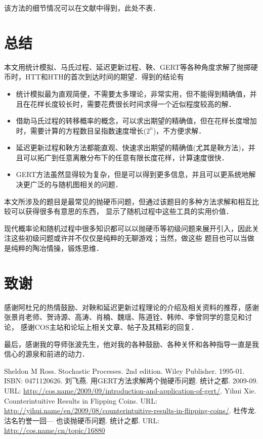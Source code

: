 \documentclass{article}
\begin{document}
该方法的细节情况可以在文献\cite{2}中得到，此处不表．
\section{总结}
本文用统计模拟、马氏过程、延迟更新过程、鞅、GERT等各种角度求解了抛掷硬币时，HTT和HTH的首次到达时间的期望．得到的结论有

\begin{itemize}
\item 统计模拟最为直观简便，不需要太多理论，非常实用，但不能得到精确值，并且在花样长度较长时，需要花费很长时间求得一个近似程度较高的解．
\item 借助马氏过程的转移概率的概念，可以求出期望的精确值，但在花样长度增加时，需要计算的方程数目呈指数速度增长($2^n$)，不方便求解．
\item 延迟更新过程和鞅方法都能直观、快速求出期望的精确值(尤其是鞅方法)，并且可以拓广到任意离散分布下的任意有限长度花样，计算速度很快．
\item GERT方法虽然显得较为复杂，但是可以得到更多信息，并且可以更系统地解决更广泛的与随机图相关的问题．
\end{itemize}

本文所涉及的题目是最常见的抛硬币问题，但通过该题目的多种方法求解和相互比较可以获得很多有意思的东西，
显示了随机过程中这些工具的实用价值．

现代概率论和随机过程中很多知识都可以以抛硬币等初级问题来展开引入，因此关注这些初级问题或许并不仅仅是纯粹的无聊游戏；当然，做这些
题目也可以当做是纯粹的陶冶情操，锻炼思维．

%
\section*{致谢}
感谢阿杜兄的热情鼓励、对鞅和延迟更新过程理论的介绍及相关资料的推荐，感谢张景肖老师、贺诗源、高涛、肖楠、魏瑶、陈道铨、韩帅、李曾同学的意见和讨论，
感谢COS主站和论坛上相关文章、帖子及其精彩的回复．

最后，感谢我的导师张波先生，他对我的各种鼓励、各种关怀和各种指导一直是我信心的源泉和前进的动力．
%
\begin{thebibliography}{99}
 Sheldon M Ross. Stochastic Processes. 2nd edition. Wiley Publisher. 1995-01. ISBN: 0471120626.
 刘飞燕. 用GERT方法求解两个抛硬币问题. 统计之都. 2009-09. URL: \url{http://cos.name/2009/09/introduction-and-application-of-gert/}.
 Yihui Xie. Counterintuitive Results in Flipping Coins.
URL: \url{http://yihui.name/en/2009/08/counterintuitive-results-in-flipping-coins/}.
 杜传龙. 沽名钓誉一回--- 也谈抛硬币问题. 统计之都.  URL: \url{http://cos.name/cn/topic/16880}
\end{thebibliography}


\end{document}

